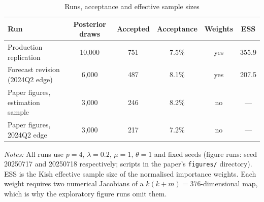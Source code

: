 \begin{table}[h]
\centering
\caption{Runs, acceptance and effective sample sizes}
\label{tab:diagnostics}
\small
\begin{tabular}{lccccc}
\toprule
Run & Posterior draws & Accepted & Acceptance & Weights & ESS \\
\midrule
Production replication & 10{,}000 & 751 & 7.5\% & yes & 355.9 \\
Forecast revision (2024Q2 edge) & 6{,}000 & 487 & 8.1\% & yes & 207.5 \\
Paper figures, estimation sample & 3{,}000 & 246 & 8.2\% & no & --- \\
Paper figures, 2024Q2 edge & 3{,}000 & 217 & 7.2\% & no & --- \\
\bottomrule
\end{tabular}
\par\smallskip
\parbox{0.9\textwidth}{\footnotesize \emph{Notes:} All runs use $p=4$, $\lambda=0.2$, $\mu=1$, $\theta=1$ and fixed seeds (figure runs: seed 20250717 and 20250718 respectively; scripts in the paper's \texttt{figures/} directory). ESS is the Kish effective sample size of the normalised importance weights. Each weight requires two numerical Jacobians of a $k(k+m) = 376$-dimensional map, which is why the exploratory figure runs omit them.}
\end{table}
